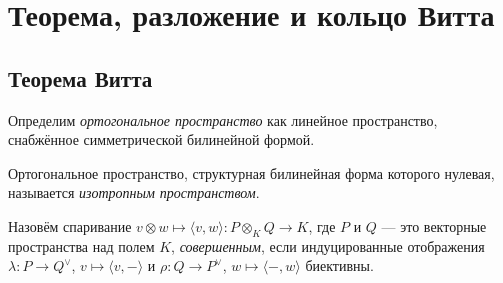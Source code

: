 \documentclass[
	extrafontsizes,
	11pt,
	hyphens,
]{memoir}
\begin{document}
\section{Теорема, разложение и кольцо Витта}

\subsection{Теорема Витта}


\begin{definition}
Определим \emph{ортогональное пространство} как линейное пространство, снабжённое симметрической билинейной формой.
\end{definition}

\begin{definition}
Ортогональное пространство, структурная билинейная форма которого нулевая, называется \emph{изотропным пространством}.
\end{definition}



\begin{definition}
\label{def:PerfPair}
Назовём спаривание \(v \otimes w \mapsto \langle v, w \rangle : P \otimes_K Q \to K\),
где \(P\) и \(Q\) --- это векторные пространства над полем \(K\), 
\emph{совершенным}, если индуцированные отображения
\(\lambda: P \to Q^\vee\),
\(v \mapsto \langle v, - \rangle\)
и
\(\rho: Q \to P^\vee\),
\(w \mapsto \langle -, w \rangle\)
биективны.
\end{definition}
\end{document}
